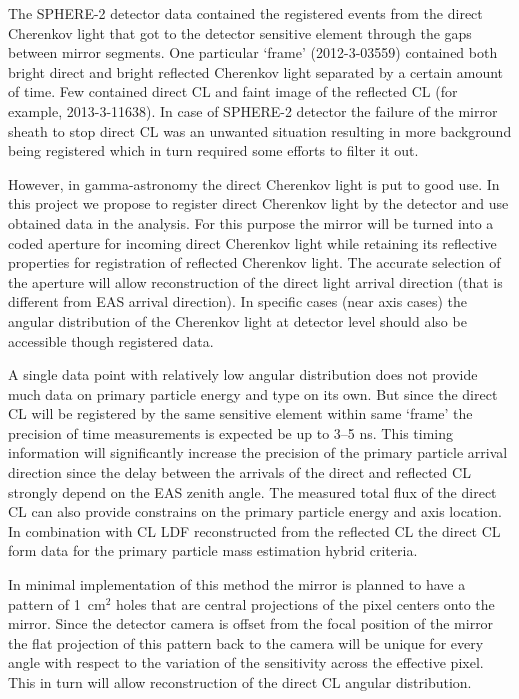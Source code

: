 \documentclass[a4paper,11pt]{article}
\begin{document}
The SPHERE-2 detector data contained the registered events from the direct Cherenkov light that got to the detector sensitive element through the gaps between mirror segments. One particular `frame' (2012-3-03559) contained both bright direct and bright reflected Cherenkov light separated by a certain amount of time. Few contained direct CL and faint image of the reflected CL (for example, 2013-3-11638). In case of SPHERE-2 detector the failure of the mirror sheath to stop direct CL was an unwanted situation resulting in more background being registered which in turn required some efforts to filter it out.



However, in gamma-astronomy the direct Cherenkov light is put to good use. In this project we propose to register direct Cherenkov light by the detector and use obtained data in the analysis. For this purpose the mirror will be turned into a coded aperture for incoming direct Cherenkov light while retaining its reflective properties for registration of reflected Cherenkov light. The accurate selection of the aperture will allow reconstruction of the direct light arrival direction (that is different from EAS arrival direction). In specific cases (near axis cases) the angular distribution of the Cherenkov light at detector level should also be accessible though registered data.

A single data point with relatively low angular distribution does not provide much data on primary particle energy and type on its own. But since the direct CL will be registered by the same sensitive element within same `frame' the precision of time measurements is expected be up to 3--5 ns. This timing information will significantly increase the precision of the primary particle arrival direction since the delay between the arrivals of the direct and reflected CL strongly depend on the EAS zenith angle. The measured total flux of the direct CL can also provide constrains on the primary particle energy and axis location. In combination with CL LDF reconstructed from the reflected CL the direct CL form data for the primary particle mass estimation hybrid criteria.

In minimal implementation of this method the mirror is planned to have a pattern of 1~cm$^2$ holes that are central projections of the pixel centers onto the mirror. Since the detector camera is offset from the focal position of the mirror the flat projection of this pattern back to the camera will be unique for every angle with respect to the variation of the sensitivity across the effective pixel. This in turn will allow reconstruction of the direct CL angular distribution.
\end{document}
